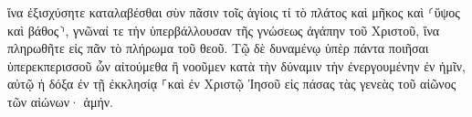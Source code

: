 \documentclass{openreader}
\begin{document}
ἵνα ἐξισχύσητε καταλαβέσθαι σὺν πᾶσιν τοῖς ἁγίοις τί τὸ πλάτος καὶ μῆκος καὶ ⸂ὕψος καὶ βάθος⸃, 
γνῶναί τε τὴν ὑπερβάλλουσαν τῆς γνώσεως ἀγάπην τοῦ Χριστοῦ, ἵνα πληρωθῆτε εἰς πᾶν τὸ πλήρωμα τοῦ θεοῦ. 
Τῷ δὲ δυναμένῳ ὑπὲρ πάντα ποιῆσαι ὑπερεκπερισσοῦ ὧν αἰτούμεθα ἢ νοοῦμεν κατὰ τὴν δύναμιν τὴν ἐνεργουμένην ἐν ἡμῖν, 
αὐτῷ ἡ δόξα ἐν τῇ ἐκκλησίᾳ ⸀καὶ ἐν Χριστῷ Ἰησοῦ εἰς πάσας τὰς γενεὰς τοῦ αἰῶνος τῶν αἰώνων· ἀμήν. 
\end{document}
